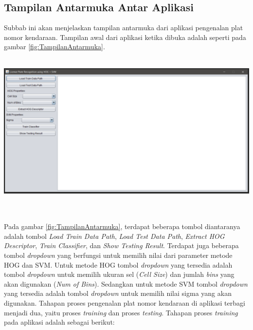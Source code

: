\subsection{Tampilan Antarmuka Antar Aplikasi}
\noindent Subbab ini akan menjelaskan tampilan antarmuka dari aplikasi pengenalan plat nomor kendaraan. Tampilan awal dari aplikasi ketika dibuka adalah seperti pada gambar \ref{fig:TampilanAntarmuka}. \\
\\
\begin{adjustbox}{width=1\textwidth}
	\noindent\begin{minipage}{\linewidth}
		\centering\includegraphics[width=16cm]{images/TampilanAntarmuka.png}
		\label{fig:TampilanAntarmuka}
	\end{minipage}
\end{adjustbox}\\
\\
\noindent Pada gambar \ref{fig:TampilanAntarmuka}, terdapat beberapa tombol diantaranya adalah tombol \textit{Load Train Data Path}, \textit{Load Test Data Path}, \textit{Extract HOG Descriptor}, \textit{Train Classifier}, dan \textit{Show Testing Result}. Terdapat juga beberapa tombol \textit{dropdown} yang berfungsi untuk memilih nilai dari parameter metode HOG dan SVM. Untuk metode HOG tombol \textit{dropdown} yang tersedia adalah tombol \textit{dropdown} untuk memilih ukuran sel (\textit{Cell Size}) dan jumlah \textit{bins} yang akan digunakan (\textit{Num of Bins}). Sedangkan untuk metode SVM tombol \textit{dropdown} yang tersedia adalah tombol \textit{dropdown} untuk memilih nilai sigma yang akan digunakan. Tahapan proses pengenalan plat nomor kendaraan di aplikasi terbagi menjadi dua, yaitu proses \textit{training} dan proses \textit{testing}. Tahapan proses \textit{training} pada aplikasi adalah sebagai berikut:
